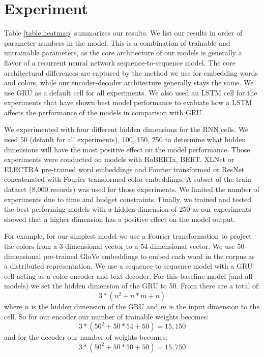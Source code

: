 \section{Experiment}

Table \ref{table:heatmap} summarizes our results. We list our results in order of parameter numbers in the model. This is a combination of trainable and untrainable parameters, as the core architecture of our models is generally a flavor of a recurrent neural network sequence-to-sequence model. The core architectural differences are captured by the method we use for embedding words and colors, while our encoder-decoder architecture generally stays the same. We use GRU as a default cell for all experiments. We also used an LSTM cell for the experiments that have shown best model performance to evaluate how a LSTM affects the performance of the models in comparison with GRU.

\par
We experimented with four different hidden dimensions for the RNN cells. We used 50 (default for all experiments), 100, 150, 250 to determine what hidden dimensions will have the most positive effect on the model performance. Those experiments were conducted on models with RoBERTa, BERT, XLNet or ELECTRA pre-trained word embeddings and Fourier transformed or ResNet concatenated with Fourier transformed color embeddings. A subset of the train dataset (8,000 records) was used for those experiments. We limited the number of experiments due to time and budget constraints. Finally, we trained and tested the best performing models with a hidden dimension of 250 as our experiments showed that a higher dimension has a positive effect on the model output.

\par
For example, for our simplest model we use a Fourier transformation to project the colors from a 3-dimensional vector to a 54-dimensional vector. We use 50-dimensional pre-trained GloVe embeddings to embed each word in the corpus as a distributed representation. We use a sequence-to-sequence model with a GRU cell acting as a color encoder and text decoder.  For this baseline model (and all models) we set the hidden dimension of the GRU to 50. From \citep{dey-2017-gru} there are a total of:
\begin{equation}
  3*(n^2 + n*m +n)
\end{equation}
where \(n\) is the hidden dimension of the GRU and \(m\) is the input dimension to the cell. So for our encoder our number of trainable weights becomes:
\begin{equation}
  3*(50^2 + 50*54 +50) = 15,150
\end{equation}
and for the decoder our number of weights becomes:
\begin{equation}
  3*(50^2 + 50*50 +50) = 15,750
\end{equation}

